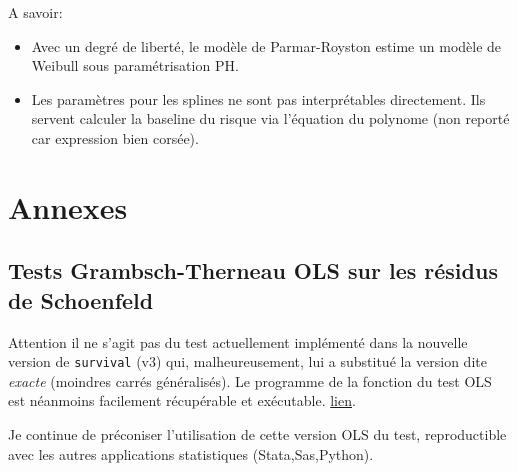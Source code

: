\documentclass[
  12pt,
  letterpaper,
  DIV=11,
  numbers=noendperiod,
  onepage,
  openany]{scrreprt}
\providecommand{\tightlist}{%
  \setlength{\itemsep}{0pt}\setlength{\parskip}{0pt}}\usepackage{longtable,booktabs,array}
\begin{document}
A savoir:

\begin{itemize}
\tightlist
\item
  Avec un degré de liberté, le modèle de Parmar-Royston estime un modèle
  de Weibull sous paramétrisation PH.
\item
  Les paramètres pour les splines ne sont pas interprétables
  directement. Ils servent calculer la baseline du risque via l'équation
  du polynome (non reporté car expression bien corsée).
\end{itemize}

\hypertarget{annexes}{%
\chapter{\texorpdfstring{\textbf{Annexes}}{Annexes}}\label{annexes}}

\hypertarget{tests-grambsch-therneau-ols-sur-les-ruxe9sidus-de-schoenfeld}{%
\section{Tests Grambsch-Therneau OLS sur les résidus de
Schoenfeld}\label{tests-grambsch-therneau-ols-sur-les-ruxe9sidus-de-schoenfeld}}

\begin{tcolorbox}[enhanced jigsaw, arc=.35mm, bottomrule=.15mm, titlerule=0mm, colbacktitle=quarto-callout-important-color!10!white, left=2mm, opacitybacktitle=0.6, toprule=.15mm, title=\textcolor{quarto-callout-important-color}{\faExclamation}\hspace{0.5em}{Important}, colframe=quarto-callout-important-color-frame, breakable, coltitle=black, opacityback=0, toptitle=1mm, bottomtitle=1mm, rightrule=.15mm, leftrule=.75mm, colback=white]

Attention il ne s'agit pas du test actuellement implémenté dans la
nouvelle version de \texttt{survival} (v3) qui, malheureusement, lui a
substitué la version dite \emph{exacte} (moindres carrés généralisés).
Le programme de la fonction du test OLS est néanmoins facilement
récupérable et exécutable.
\href{https://github.com/mthevenin/analyse_duree/blob/main/cox.zphold/cox.zphold.R}{lien}.

Je continue de préconiser l'utilisation de cette version OLS du test,
reproductible avec les autres applications statistiques
(Stata,Sas,Python).

\end{tcolorbox}
\end{document}
